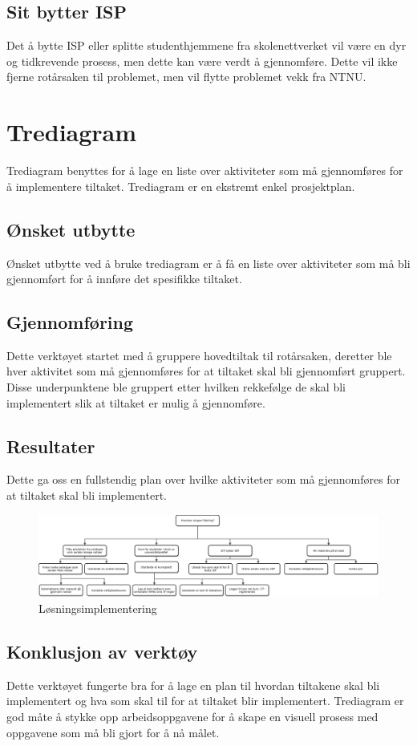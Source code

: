 \subsection{Sit bytter ISP}
Det å bytte ISP eller splitte studenthjemmene fra skolenettverket vil være en dyr og tidkrevende prosess, men dette kan være verdt å gjennomføre. Dette vil ikke fjerne rotårsaken til problemet, men vil flytte problemet vekk fra NTNU.


\section{Trediagram}
Trediagram benyttes for å lage en liste over aktiviteter som må gjennomføres for å implementere tiltaket. Trediagram er en ekstremt enkel prosjektplan.

\subsection{Ønsket utbytte}
Ønsket utbytte ved å bruke trediagram er å få en liste over aktiviteter som må bli gjennomført for å innføre det spesifikke tiltaket.   

\subsection{Gjennomføring}
Dette verktøyet startet med å gruppere hovedtiltak til rotårsaken, deretter ble hver aktivitet som må gjennomføres for at tiltaket skal bli gjennomført gruppert. Disse underpunktene ble gruppert etter hvilken rekkefølge de skal bli implementert slik at tiltaket er mulig å gjennomføre. 

\subsection{Resultater}
Dette ga oss en fullstendig plan over hvilke aktiviteter som må gjennomføres for at tiltaket skal bli implementert. 

\begin{figure}[H] 
    \centering    
    \includegraphics[scale=0.55, angle=90]{case_1/bilder/Tre-diagram.pdf}
    \caption[Trediagram til tiltak for case 1]{Løsningsimplementering}
    \label{fig:Tre-diagram}
\end{figure}

\subsection{Konklusjon av verktøy}
Dette verktøyet fungerte bra for å lage en plan til hvordan tiltakene skal bli implementert og hva som skal til for at tiltaket blir implementert. Trediagram er god måte å stykke opp arbeidsoppgavene for å skape en visuell prosess med oppgavene som må bli gjort for å nå målet.